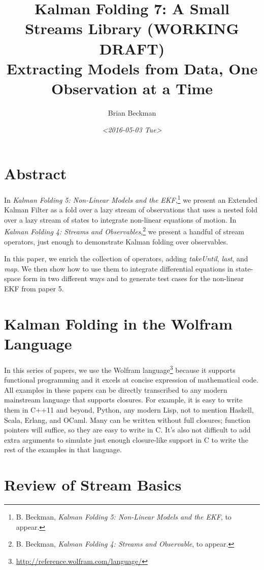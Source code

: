 \documentclass[10pt,oneside,x11names]{article}
\author{Brian Beckman}
\date{\textit{<2016-05-03 Tue>}}
\title{Kalman Folding 7: A Small Streams Library (WORKING DRAFT)\\\medskip
\large Extracting Models from Data, One Observation at a Time}
\begin{document}
\maketitle
\setcounter{tocdepth}{2}
\tableofcontents


\section{Abstract}
\label{sec:orgheadline1}

In \emph{Kalman Folding 5: Non-Linear Models and the EKF},\footnote{B. Beckman, \emph{Kalman Folding 5: Non-Linear Models and the EKF}, to appear.} we present an
Extended Kalman Filter as a fold over a lazy stream of observations that uses a
nested fold over a lazy stream of states to integrate non-linear equations of
motion. In \emph{Kalman Folding 4: Streams and Observables},\footnote{B. Beckman, \emph{Kalman Folding 4: Streams and Observable}, to appear.} we present a
handful of stream operators, just enough to demonstrate Kalman folding over
observables.

In this paper, we enrich the collection of operators, adding \emph{takeUntil},
\emph{last}, and \emph{map}. We then show how to use them to integrate differential
equations in state-space form in two different ways and to generate test cases
for the non-linear EKF from paper 5.

\section{Kalman Folding in the Wolfram Language}
\label{sec:orgheadline2}

In this series of papers, we use the Wolfram language\footnote{\url{http://reference.wolfram.com/language/}} because it
supports functional programming and it excels
at concise expression of mathematical code. All examples in these papers can be
directly transcribed to any modern mainstream language that supports closures.
For example, it is easy to write them in C++11 and beyond, Python, any modern
Lisp, not to mention Haskell, Scala, Erlang, and OCaml. Many can be written
without full closures; function pointers will suffice, so they are easy to write
in C. It's also not difficult to add extra arguments to simulate just enough
closure-like support in C to write the rest of the examples in that language.

\section{Review of Stream Basics}
\label{sec:orgheadline3}
\end{document}
